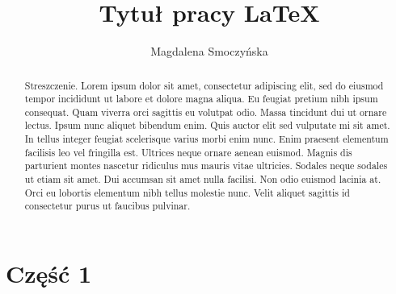 \documentclass[12pt,a4paper]{article}
\title{Tytuł pracy \LaTeX}
\author{Magdalena Smoczyńska}
\begin{document}
	\maketitle
	
	\begin{abstract}
		Streszczenie. Lorem ipsum dolor sit amet, consectetur adipiscing elit, sed do eiusmod tempor incididunt ut labore et dolore magna aliqua. Eu feugiat pretium nibh ipsum consequat. Quam viverra orci sagittis eu volutpat odio. Massa tincidunt dui ut ornare lectus. Ipsum nunc aliquet bibendum enim. Quis auctor elit sed vulputate mi sit amet. In tellus integer feugiat scelerisque varius morbi enim nunc. Enim praesent elementum facilisis leo vel fringilla est. Ultrices neque ornare aenean euismod. Magnis dis parturient montes nascetur ridiculus mus mauris vitae ultricies. Sodales neque sodales ut etiam sit amet. Dui accumsan sit amet nulla facilisi. Non odio euismod lacinia at. Orci eu lobortis elementum nibh tellus molestie nunc. Velit aliquet sagittis id consectetur purus ut faucibus pulvinar.
	\end{abstract}
	
	\newpage
	
	\tableofcontents
	
	\newpage
	
	\part {Część 1}
\end{document}
